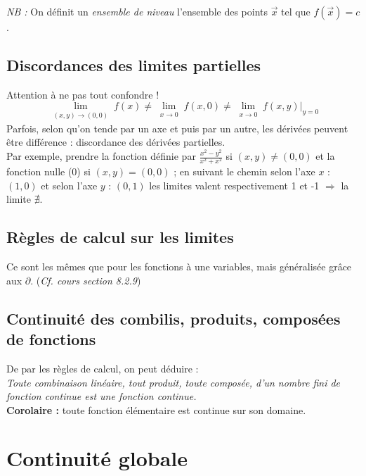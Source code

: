 \documentclass	[11pt, a4paper, openany]{book}
\begin{document}
\textit{NB :} On définit un \textit{ensemble de niveau} l'ensemble des points $\vec{x}$ tel que $f(\vec{x}) = c$.

\subsection{Discordances des limites partielles}
Attention à ne pas tout confondre ! 
$$\lim\limits_{\substack{(x,y) \to (0,0)}} f(x) \neq \lim\limits_{\substack{x \to 0}} f(x,0)\neq \lim\limits_{\substack{x \to 0}} f(x,y)|_{y=0}$$
Parfois, selon qu'on tende par un axe et puis par un autre, les dérivées peuvent être différence : discordance des dérivées partielles.\\

Par exemple, prendre la fonction définie par $\frac{x^2 - y^2}{x^2+x^2}$ si $(x, y) \neq (0,0)$ et la fonction nulle ($0$) si $(x,y) = (0,0)$ ; en suivant le chemin selon l'axe $x$ : $(1,0)$ et selon l'axe $y$ : $(0,1)$ les limites valent respectivement 1 et -1 $\Rightarrow$ la limite $\nexists$.

\subsection{Règles de calcul sur les limites}
Ce sont les mêmes que pour les fonctions à une variables, mais généralisée grâce aux $\partial$. (\textit{Cf. cours section 8.2.9})

\subsection{Continuité des combilis, produits, composées de fonctions}
De par les règles de calcul, on peut déduire :\\
\textit{Toute combinaison linéaire, tout produit, toute composée, d'un nombre fini de fonction continue est une fonction continue.}\\
\textbf{Corolaire :} toute fonction élémentaire est continue sur son domaine.

\section{Continuité globale}
\end{document}
